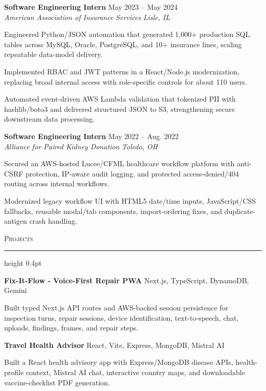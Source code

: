 \documentclass[letterpaper,11pt]{article}
\newcommand{\resumesection}[1]{%
  \par\vspace{2pt}%
  {\large\scshape #1}\par\vspace{2pt}%
  \hrule height 0.4pt\vspace{2pt}%
}
\newcommand{\resumeSubheading}[4]{
  \textbf{#1} \hfill #2\\
  \textit{#3} \hfill \textit{#4}
}
\newcommand{\projectHeading}[2]{
  \textbf{#1} \hfill #2
}
\begin{document}
\resumeSubheading
{Software Engineering Intern}{May 2023 -- May 2024}
{American Association of Insurance Services}{Lisle, IL}
\begin{tightitemize}
  \item Engineered Python/JSON automation that generated 1,000+ production SQL tables across MySQL, Oracle, PostgreSQL, and 10+ insurance lines, scaling repeatable data-model delivery.
  \item Implemented RBAC and JWT patterns in a React/Node.js modernization, replacing broad internal access with role-specific controls for about 110 users.
  \item Automated event-driven AWS Lambda validation that tokenized PII with hashlib/boto3 and delivered structured JSON to S3, strengthening secure downstream data processing.
\end{tightitemize}

\resumeSubheading
{Software Engineering Intern}{May 2022 -- Aug. 2022}
{Alliance for Paired Kidney Donation}{Toledo, OH}
\begin{tightitemize}
  \item Secured an AWS-hosted Lucee/CFML healthcare workflow platform with anti-CSRF protection, IP-aware audit logging, and protected access-denied/404 routing across internal workflows.
  \item Modernized legacy workflow UI with HTML5 date/time inputs, JavaScript/CSS fallbacks, reusable modal/tab components, import-ordering fixes, and duplicate-antigen crash handling.
\end{tightitemize}

\resumesection{Projects}
\projectHeading{Fix-It-Flow - Voice-First Repair PWA}{Next.js, TypeScript, DynamoDB, Gemini}
\begin{tightitemize}
  \item Built typed Next.js API routes and AWS-backed session persistence for inspection turns, repair sessions, device identification, text-to-speech, chat, uploads, findings, frames, and repair steps.
\end{tightitemize}

\projectHeading{Travel Health Advisor}{React, Vite, Express, MongoDB, Mistral AI}
\begin{tightitemize}
  \item Built a React health advisory app with Express/MongoDB disease APIs, health-profile context, Mistral AI chat, interactive country maps, and downloadable vaccine-checklist PDF generation.
\end{tightitemize}
\end{document}
